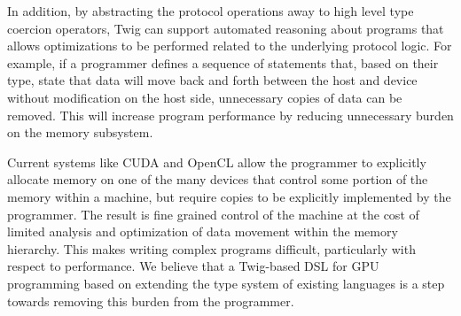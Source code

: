In addition, by abstracting the protocol operations away to high level type
coercion operators, Twig can support automated reasoning about programs that
allows optimizations to be performed related to the underlying protocol logic.
For example, if a programmer defines a sequence of statements that, based on
their type, state that data will move back and forth between the host and
device without modification on the host side, unnecessary copies of data can
be removed. This will increase program performance by reducing unnecessary
burden on the memory subsystem.

Current systems like CUDA and OpenCL allow the programmer to explicitly
allocate memory on one of the many devices that control some portion of the
memory within a machine, but require copies to be explicitly implemented by
the programmer. The result is fine grained control of the machine at the cost
of limited analysis and optimization of data movement within the memory
hierarchy. This makes writing complex programs difficult, particularly with
respect to performance. We believe that a Twig-based DSL for GPU programming
based on extending the type system of existing languages is a step towards
removing this burden from the programmer.
